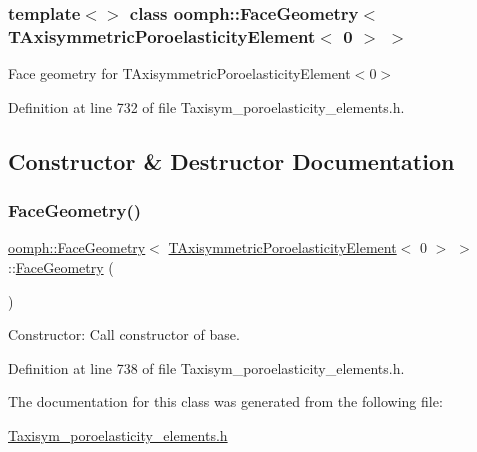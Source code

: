 \subsubsection*{template$<$$>$\newline
class oomph\+::\+Face\+Geometry$<$ T\+Axisymmetric\+Poroelasticity\+Element$<$ 0 $>$ $>$}

Face geometry for T\+Axisymmetric\+Poroelasticity\+Element$<$0$>$ 

Definition at line 732 of file Taxisym\+\_\+poroelasticity\+\_\+elements.\+h.



\subsection{Constructor \& Destructor Documentation}
\mbox{\label{classoomph_1_1FaceGeometry_3_01TAxisymmetricPoroelasticityElement_3_010_01_4_01_4_a29e20c532b17421fbff9640cbc6aee0c}} 
\subsubsection{\texorpdfstring{Face\+Geometry()}{FaceGeometry()}}
{\footnotesize\ttfamily \hyperlink{classoomph_1_1FaceGeometry}{oomph\+::\+Face\+Geometry}$<$ \hyperlink{classoomph_1_1TAxisymmetricPoroelasticityElement}{T\+Axisymmetric\+Poroelasticity\+Element}$<$ 0 $>$ $>$\+::\hyperlink{classoomph_1_1FaceGeometry}{Face\+Geometry} (\begin{DoxyParamCaption}{ }\end{DoxyParamCaption})\hspace{0.3cm}{\ttfamily [inline]}}



Constructor\+: Call constructor of base. 



Definition at line 738 of file Taxisym\+\_\+poroelasticity\+\_\+elements.\+h.



The documentation for this class was generated from the following file\+:\begin{DoxyCompactItemize}
\item 
\hyperlink{Taxisym__poroelasticity__elements_8h}{Taxisym\+\_\+poroelasticity\+\_\+elements.\+h}\end{DoxyCompactItemize}
